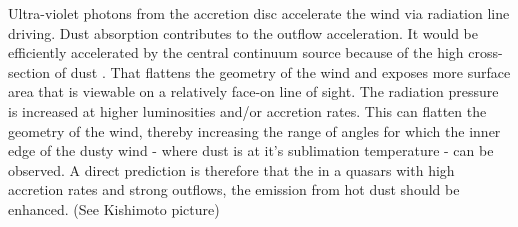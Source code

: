 Ultra-violet photons from the accretion disc accelerate the wind via radiation line driving.
Dust absorption contributes to the outflow acceleration. 
It would be efficiently accelerated by the central continuum source because of the high cross-section of dust \citep[e.g.][]{fabian12}.  
That flattens the geometry of the wind and exposes more surface area that is viewable on a relatively face-on line of sight.  
The radiation pressure is increased at higher luminosities and/or accretion rates.
This can flatten the geometry of the wind, thereby increasing the range of angles for which the inner edge of the dusty wind - where dust is at it's sublimation temperature - can be observed. 
A direct prediction is therefore that the in a quasars with high accretion rates and strong outflows, the emission from hot dust should be enhanced. 
(See Kishimoto picture)

